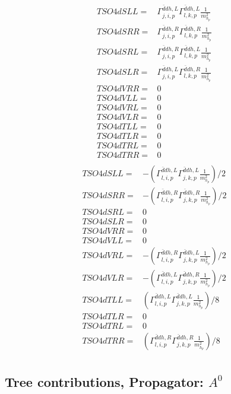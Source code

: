 \documentclass[A4,landscape]{article}
\begin{document}
\begin{align} 
  TSO4dSLL= & \Gamma^{\bar{d}d h ,L}_{j, i, p} \Gamma^{\bar{d}d h ,L}_{l, k, p} \frac{1}{m^2_{h_{{p}}}} \\ 
  TSO4dSRR= & \Gamma^{\bar{d}d h ,R}_{j, i, p} \Gamma^{\bar{d}d h ,R}_{l, k, p} \frac{1}{m^2_{h_{{p}}}} \\ 
  TSO4dSRL= & \Gamma^{\bar{d}d h ,R}_{j, i, p} \Gamma^{\bar{d}d h ,L}_{l, k, p} \frac{1}{m^2_{h_{{p}}}} \\ 
  TSO4dSLR= & \Gamma^{\bar{d}d h ,L}_{j, i, p} \Gamma^{\bar{d}d h ,R}_{l, k, p} \frac{1}{m^2_{h_{{p}}}} \\ 
  TSO4dVRR= & 0 \\ 
  TSO4dVLL= & 0 \\ 
  TSO4dVRL= & 0 \\ 
  TSO4dVLR= & 0 \\ 
  TSO4dTLL= & 0 \\ 
  TSO4dTLR= & 0 \\ 
  TSO4dTRL= & 0 \\ 
  TSO4dTRR= & 0 \\ 
\end{align} 
\begin{align} 
  TSO4dSLL= & -(\Gamma^{\bar{d}d h ,L}_{l, i, p} \Gamma^{\bar{d}d h ,L}_{j, k, p} \frac{1}{m^2_{h_{{p}}}})/2 \\ 
  TSO4dSRR= & -(\Gamma^{\bar{d}d h ,R}_{l, i, p} \Gamma^{\bar{d}d h ,R}_{j, k, p} \frac{1}{m^2_{h_{{p}}}})/2 \\ 
  TSO4dSRL= & 0 \\ 
  TSO4dSLR= & 0 \\ 
  TSO4dVRR= & 0 \\ 
  TSO4dVLL= & 0 \\ 
  TSO4dVRL= & -(\Gamma^{\bar{d}d h ,R}_{l, i, p} \Gamma^{\bar{d}d h ,L}_{j, k, p} \frac{1}{m^2_{h_{{p}}}})/2 \\ 
  TSO4dVLR= & -(\Gamma^{\bar{d}d h ,L}_{l, i, p} \Gamma^{\bar{d}d h ,R}_{j, k, p} \frac{1}{m^2_{h_{{p}}}})/2 \\ 
  TSO4dTLL= & (\Gamma^{\bar{d}d h ,L}_{l, i, p} \Gamma^{\bar{d}d h ,L}_{j, k, p} \frac{1}{m^2_{h_{{p}}}})/8 \\ 
  TSO4dTLR= & 0 \\ 
  TSO4dTRL= & 0 \\ 
  TSO4dTRR= & (\Gamma^{\bar{d}d h ,R}_{l, i, p} \Gamma^{\bar{d}d h ,R}_{j, k, p} \frac{1}{m^2_{h_{{p}}}})/8 \\ 
\end{align} 
\subsection{Tree contributions, Propagator: $A^0$} 
\end{document}
